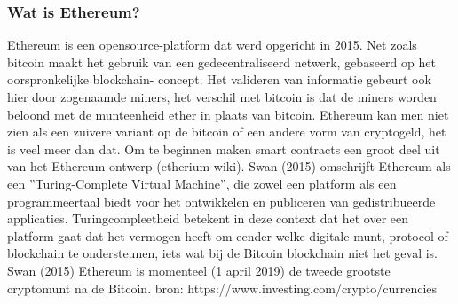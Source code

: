 		\subsubsection{Wat is Ethereum?}
			Ethereum is een opensource-platform dat werd opgericht in 2015. Net zoals bitcoin maakt het gebruik van een gedecentraliseerd netwerk, gebaseerd op het oorspronkelijke blockchain- concept. Het valideren van informatie gebeurt ook hier door zogenaamde miners, het verschil met bitcoin is dat de miners worden beloond met de munteenheid ether in plaats van bitcoin. Ethereum kan men niet zien als een zuivere variant op de bitcoin of een andere vorm van cryptogeld, het is veel meer dan dat. Om te beginnen maken smart contracts  een groot deel uit van het Ethereum ontwerp (etherium wiki). Swan (2015) omschrijft Ethereum als een ”Turing-Complete Virtual Machine”, die zowel een platform als een programmeertaal biedt voor het ontwikkelen en publiceren van gedistribueerde applicaties. Turingcompleetheid betekent in deze context dat het over een platform gaat dat het vermogen heeft om eender welke digitale munt, protocol of blockchain te ondersteunen, iets wat bij de Bitcoin blockchain niet het geval is. Swan (2015)  Ethereum is momenteel (1 april 2019) de tweede grootste cryptomunt na de Bitcoin. bron: https://www.investing.com/crypto/currencies
			
